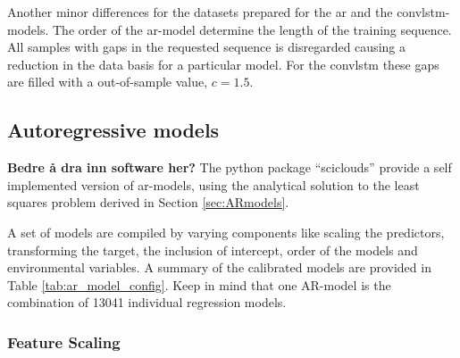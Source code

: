 Another minor differences for the datasets prepared for the \acrshort{ar} and the \acrshort{convlstm}-models. The order of the \acrshort{ar}-model determine the length of the training sequence. All samples with gaps in the requested sequence is disregarded causing a reduction in the data basis for a particular model. For the \acrshort{convlstm} these gaps are filled with a out-of-sample value, $c=1.5$.


\subsection{Autoregressive models}
\textbf{Bedre å dra inn software her?}
The python package ``sciclouds'' provide a self implemented version of \acrshort{ar}-models, using the analytical solution to the least squares problem derived in Section \ref{sec:ARmodels}. %

A set of models are compiled by varying components like scaling the predictors, transforming the target, the inclusion of intercept, order of the models and environmental variables. A summary of the calibrated models are provided in Table \ref{tab:ar_model_config}. Keep in mind that one AR-model is the combination of 13041 individual regression models.  


\subsubsection{Feature Scaling} \label{sec:scaling_predictors}

